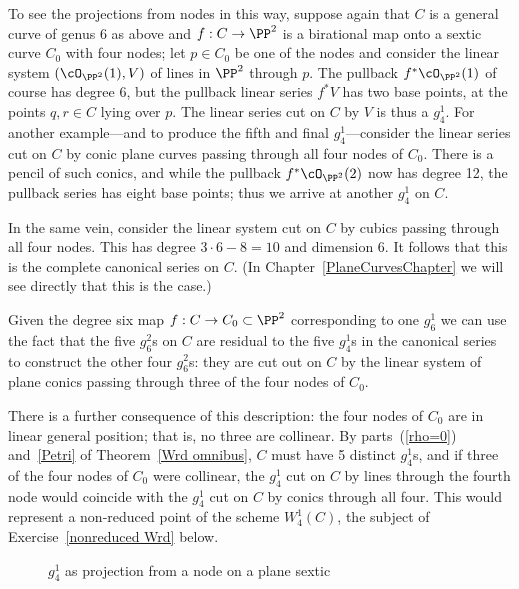 To see the projections from nodes in this way,  suppose again that $C$ is a general curve of genus 6 as above and $f : C \to \PP^2$ is a birational map onto a sextic curve $C_0$ with four nodes; let $p \in C_0$ be one of the nodes and consider the linear system $(\cO_{\PP^2}(1),V)$ of lines in $\PP^2$ through $p$. The pullback $f^*\cO_{\PP^2}(1)$ of course has degree 6, but the pullback linear series $f^*V$ has two base points, at the points $q, r \in C$ lying over $p$. The linear series cut on $C$ by $V$ is thus a $g^1_4$. For another example---and to produce the fifth and final $g^1_4$---consider the linear series cut on $C$ by conic plane curves passing through all four nodes of $C_0$. There is a pencil of such conics, and while the pullback $f^*\cO_{\PP^2}(2)$ now has degree 12, the pullback series has eight base points; thus we arrive at another $g^1_4$ on $C$.

In the same vein, consider the linear system cut on $C$ by cubics passing through all four nodes. This has degree $3\cdot 6 - 8 = 10$ and dimension 6. It follows that this is the complete canonical series on $C$. (In Chapter~\ref{PlaneCurvesChapter} we will see directly that this is the case.)

Given the degree six map $f : C \to C_0 \subset \PP^2$ corresponding to one $g^1_6$ we can use the fact that the five $g^2_6$s on $C$ are residual to the five $g^1_4$s in the canonical series to construct the other four $g^2_6$s: they are cut out on $C$ by the linear system of plane conics passing through three of the four nodes of $C_0$.

There is a further consequence of this description: the four nodes of $C_0$ are in linear general position; that is, no three are collinear. 
By parts~(\ref{rho=0}) and~\ref{Petri} of Theorem~\ref{Wrd omnibus}, $C$ must have 5 distinct $g^1_4$s, and if three of the four nodes of $C_0$ were collinear, the $g^1_4$ cut on $C$ by lines through the fourth node would coincide with the $g^1_4$ cut on $C$ by conics through all four. This would represent a non-reduced point of the scheme $W^1_4(C)$, the subject of Exercise~\ref{nonreduced Wrd} below. 

 
\begin{figure}
\begin{center}
\caption{$g^1_4$ as projection from a node on a plane sextic }
\label{default}
\end{center}
\end{figure}

